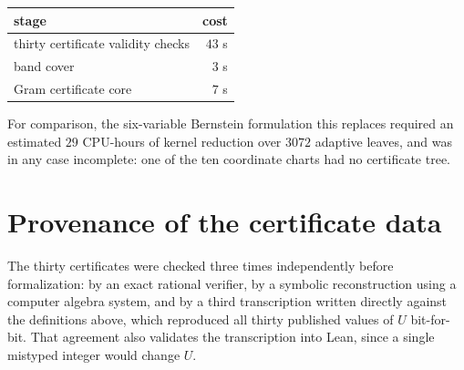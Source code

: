\documentclass[11pt]{article}
\begin{document}
\begin{center}
\begin{tabular}{@{}lr@{}}
\toprule
stage & cost\\
\midrule
thirty certificate validity checks & $43$ s\\
band cover & $3$ s\\
Gram certificate core & $7$ s\\
\bottomrule
\end{tabular}
\end{center}

For comparison, the six-variable Bernstein formulation this replaces required an estimated
$29$ CPU-hours of kernel reduction over $3072$ adaptive leaves, and was in any case incomplete:
one of the ten coordinate charts had no certificate tree.

\section{Provenance of the certificate data}

The thirty certificates were checked three times independently before formalization: by an exact
rational verifier, by a symbolic reconstruction using a computer algebra system, and by a third
transcription written directly against the definitions above, which reproduced all thirty
published values of $U$ bit-for-bit. That agreement also validates the transcription into Lean,
since a single mistyped integer would change $U$.
\end{document}
